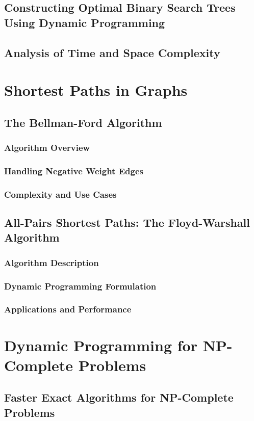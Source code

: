 \documentclass[12pt]{book} %
\begin{document}
\subsection{Constructing Optimal Binary Search Trees Using Dynamic Programming}
\subsection{Analysis of Time and Space Complexity}

\section{Shortest Paths in Graphs}
\subsection{The Bellman-Ford Algorithm}
\subsubsection{Algorithm Overview}
\subsubsection{Handling Negative Weight Edges}
\subsubsection{Complexity and Use Cases}
\subsection{All-Pairs Shortest Paths: The Floyd-Warshall Algorithm}
\subsubsection{Algorithm Description}
\subsubsection{Dynamic Programming Formulation}
\subsubsection{Applications and Performance}

\section{Dynamic Programming for NP-Complete Problems}
\subsection{Faster Exact Algorithms for NP-Complete Problems}
\end{document}
